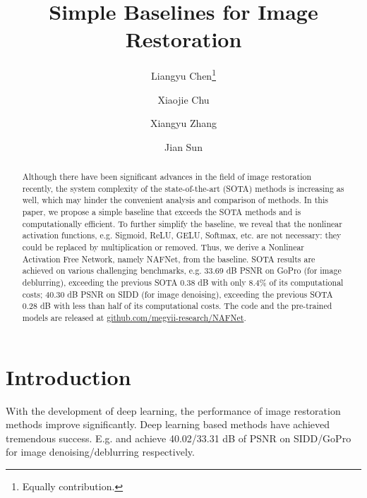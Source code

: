 \documentclass[runningheads]{llncs}
\begin{document}
\pagestyle{headings}
\mainmatter
\def\ECCVSubNumber{3043}  

\title{Simple Baselines for Image Restoration}

\begin{comment}
\titlerunning{ECCV-22 submission ID \ECCVSubNumber} 
\authorrunning{ECCV-22 submission ID \ECCVSubNumber} 
\author{Anonymous ECCV submission}
\institute{Paper ID \ECCVSubNumber}
\end{comment}




\author{Liangyu Chen\thanks{Equally contribution.} \and Xiaojie Chu \and Xiangyu Zhang \and Jian Sun\\ 
}


\maketitle

\begin{abstract}
Although there have been significant advances in the field of image restoration recently, the system complexity of the state-of-the-art (SOTA) methods is increasing as well, which may hinder the convenient analysis and comparison of methods. 
In this paper, we propose a simple baseline that exceeds the SOTA methods and is computationally efficient. 
To further simplify the baseline, we reveal that the nonlinear activation functions, e.g. Sigmoid, ReLU, GELU, Softmax, etc. are not necessary: they could be replaced by multiplication or removed. Thus, we derive a Nonlinear Activation Free Network, namely NAFNet, from the baseline. SOTA results are achieved on various challenging benchmarks, e.g. 33.69 dB PSNR on GoPro (for image deblurring), exceeding the previous SOTA 0.38 dB with only 8.4\% of its computational costs; 40.30 dB PSNR on SIDD (for image denoising), exceeding the previous SOTA 0.28 dB with less than half of its computational costs.
The code and the pre-trained models are released at \href{https://github.com/megvii-research/NAFNet}{github.com/megvii-research/NAFNet}.
\end{abstract}


\section{Introduction}
With the development of deep learning, the performance of image restoration methods improve significantly. Deep learning based methods\cite{chen2021hinet,waqas2021multi,zamir2021restormer,wang2021uformer,cheng2021nbnet,cho2021rethinking,tu2022maxim,chu2021revisiting,mao2021deep} have achieved tremendous success. E.g. \cite{zamir2021restormer} and \cite{chu2021revisiting} achieve 40.02/33.31 dB of PSNR on SIDD\cite{SIDD_2018_CVPR}/GoPro\cite{nah2017deep} for image denoising/deblurring respectively.
\end{document}
